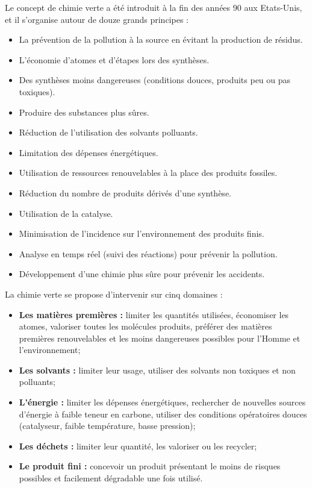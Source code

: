 \documentclass[11pt,a4paper]{report}
\begin{document}
Le concept de chimie verte a été introduit à la fin des années 90 aux Etats-Unis, et il s'organise autour de douze grands principes :\\
\begin{itemize}
	\item La prévention de la pollution à la source en évitant la production de résidus.
	\item L'économie d'atomes et d'étapes lors des synthèses.
	\item Des synthèses moins dangereuses (conditions douces, produits peu ou pas toxiques).
	\item Produire des substances plus sûres.
	\item Réduction de l'utilisation des solvants polluants.
	\item Limitation des dépenses énergétiques.
	\item Utilisation de ressources renouvelables à la place des produits fossiles.
	\item Réduction du nombre de produits dérivés d'une synthèse.
	\item Utilisation de la catalyse.
	\item Minimisation de l'incidence sur l'environnement des produits finis.
	\item Analyse en temps réel (suivi des réactions) pour prévenir la pollution.
	\item Développement d'une chimie plus sûre pour prévenir les accidents.\\
\end{itemize}

La chimie verte se propose d'intervenir sur cinq domaines :\\
\begin{itemize}
	\item \textbf{Les matières premières :} limiter les quantités utilisées, économiser les atomes, 			valoriser toutes les molécules produits, préférer des matières premières renouvelables et les 			moins dangereuses possibles pour l'Homme et l'environnement;
	\item \textbf{Les solvants :} limiter leur usage, utiliser des solvants non toxiques et non 				polluants;
	\item \textbf{L'énergie :} limiter les dépenses énergétiques, rechercher de nouvelles sources 				d'énergie à faible teneur en carbone, utiliser des conditions opératoires douces (catalyseur, 			faible température, basse pression);
	\item \textbf{Les déchets :} limiter leur quantité, les valoriser ou les recycler;
	\item \textbf{Le produit fini :} concevoir un produit présentant le moins de risques possibles et 			facilement dégradable une fois utilisé.\\
\end{itemize}
\end{document}
